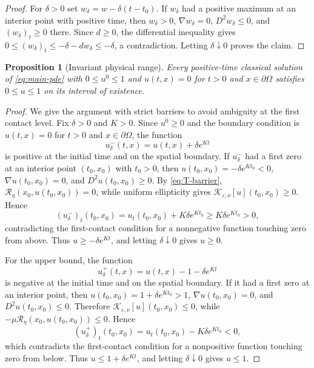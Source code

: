 \documentclass[11pt]{article}
\newtheorem{proposition}[theorem]{Proposition}
\theoremstyle{remark}
\newcommand{\eps}{\varepsilon}
\newcommand{\nupar}{\nu}
\newcommand{\cK}{\mathcal{K}}
\newcommand{\cT}{\mathcal{R}}
\begin{document}
\begin{proof}
For $\delta>0$ set $w_\delta=w-\delta(t-t_0)$.  If $w_\delta$ had a positive maximum at an interior point with positive time, then $w_\delta>0$, $\nabla w_\delta=0$, $D^2w_\delta\le0$, and $(w_\delta)_t\ge0$ there.  Since $d\ge0$, the differential inequality gives $0\le (w_\delta)_t\le -\delta-dw_\delta\le-\delta$, a contradiction.  Letting $\delta\downarrow0$ proves the claim.
\end{proof}

\begin{proposition}[Invariant physical range]\label{prop:range}
Every positive-time classical solution of \eqref{eq:main-pde} with $0\le u^0\le1$ and $u(t,x)=0$ for $t>0$ and $x\in\partial\Omega$ satisfies $0\le u\le1$ on its interval of existence.
\end{proposition}

\begin{proof}
We give the argument with strict barriers to avoid ambiguity at the first contact level.  Fix $\delta>0$ and $K>0$.  Since $u^0\ge0$ and the boundary condition is $u(t,x)=0$ for $t>0$ and $x\in\partial\Omega$, the function
\[
        u_\delta^-(t,x)=u(t,x)+\delta e^{Kt}
\]
is positive at the initial time and on the spatial boundary.  If $u_\delta^-$ had a first zero at an interior point $(t_0,x_0)$ with $t_0>0$, then $u(t_0,x_0)=-\delta e^{Kt_0}<0$, $\nabla u(t_0,x_0)=0$, and $D^2u(t_0,x_0)\ge0$.  By \eqref{eq:T-barrier}, $\cT_\eta(x_0,u(t_0,x_0))=0$, while uniform ellipticity gives $\cK_{\eps,\nupar}[u](t_0,x_0)\ge0$.  Hence
\[
        (u_\delta^-)_t(t_0,x_0)=u_t(t_0,x_0)+K\delta e^{Kt_0}
        \ge K\delta e^{Kt_0}>0,
\]
contradicting the first-contact condition for a nonnegative function touching zero from above.  Thus $u\ge-\delta e^{Kt}$, and letting $\delta\downarrow0$ gives $u\ge0$.

For the upper bound, the function
\[
        u_\delta^+(t,x)=u(t,x)-1-\delta e^{Kt}
\]
is negative at the initial time and on the spatial boundary.  If it had a first zero at an interior point, then $u(t_0,x_0)=1+\delta e^{Kt_0}>1$, $\nabla u(t_0,x_0)=0$, and $D^2u(t_0,x_0)\le0$.  Therefore $\cK_{\eps,\nupar}[u](t_0,x_0)\le0$, while $-\mu\cT_\eta(x_0,u(t_0,x_0))\le0$.  Hence
\[
        (u_\delta^+)_t(t_0,x_0)=u_t(t_0,x_0)-K\delta e^{Kt_0}<0,
\]
which contradicts the first-contact condition for a nonpositive function touching zero from below.  Thus $u\le1+\delta e^{Kt}$, and letting $\delta\downarrow0$ gives $u\le1$.
\end{proof}
\end{document}
